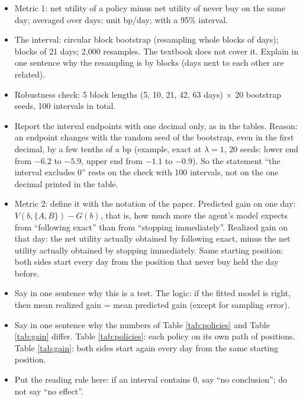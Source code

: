 \documentclass{article}
\newenvironment{pts}{\begin{itemize}[nosep,leftmargin=1.15em,topsep=1pt]}{\end{itemize}}
\begin{document}
\begin{note}
\begin{pts}
\item Metric 1: net utility of a policy minus net utility of never buy on the same day; averaged over days; unit bp/day; with a 95\% interval.
\item The interval: circular block bootstrap \citep{politis1992circular} (resampling whole blocks of days); blocks of 21 days; 2{,}000 resamples. The textbook does not cover it. Explain in one sentence why the resampling is by blocks (days next to each other are related).
\item Robustness check: 5 block lengths (5, 10, 21, 42, 63 days) $\times$ 20 bootstrap seeds, 100 intervals in total.
\item Report the interval endpoints with one decimal only, as in the tables. Reason: an endpoint changes with the random seed of the bootstrap, even in the first decimal, by a few tenths of a bp (example, exact at $\lambda=1$, 20 seeds: lower end from $-6.2$ to $-5.9$, upper end from $-1.1$ to $-0.9$). So the statement ``the interval excludes 0'' rests on the check with 100 intervals, not on the one decimal printed in the table.
\item Metric 2: define it with the notation of the paper. Predicted gain on one day: $V(b,\{A,B\}) - G(b)$, that is, how much more the agent's model expects from ``following exact'' than from ``stopping immediately''. Realized gain on that day: the net utility actually obtained by following exact, minus the net utility actually obtained by stopping immediately. Same starting position: both sides start every day from the position that never buy held the day before.
\item Say in one sentence why this is a test. The logic: if the fitted model is right, then mean realized gain = mean predicted gain (except for sampling error).
\item Say in one sentence why the numbers of Table \ref{tab:policies} and Table \ref{tab:gain} differ. Table \ref{tab:policies}: each policy on its own path of positions. Table \ref{tab:gain}: both sides start again every day from the same starting position.
\item Put the reading rule here: if an interval contains 0, say ``no conclusion''; do not say ``no effect''.
\end{pts}
\end{note}
\end{document}

